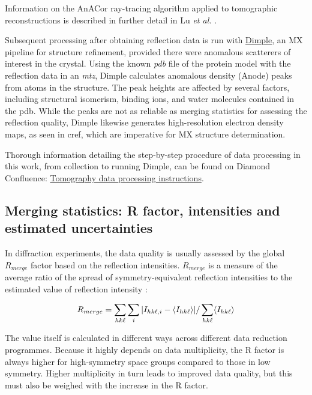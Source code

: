 Information on the AnACor ray-tracing algorithm applied to tomographic reconstructions is described in further detail in Lu \textit{et al.} \cite{Lu}.

Subsequent processing after obtaining reflection data is run with \href{http://ccp4.github.io/dimple}{Dimple}, an MX pipeline for structure refinement, provided there were anomalous scatterers of interest in the crystal. Using the known \textit{pdb} file of the protein model with the reflection data in an \textit{mtz}, Dimple calculates anomalous density (Anode) peaks from atoms in the structure. The peak heights are affected by several factors, including structural isomerism, binding ions, and water molecules contained in the pdb. While the peaks are not as reliable as merging statistics for assessing the reflection quality, Dimple likewise generates high-resolution electron density maps, as seen in cref{}, which are imperative for MX structure determination.

Thorough information detailing the step-by-step procedure of data processing in this work, from collection to running Dimple, can be found on Diamond Confluence: \href{https://confluence.diamond.ac.uk/x/yIWuD}{Tomography data processing instructions}. %


\subsection{Merging statistics: R factor, intensities and estimated uncertainties}

In diffraction experiments, the data quality is usually assessed by the global $R_{merge}$ factor based on the reflection intensities. $R_{merge}$ is a measure of the average ratio of the spread of symmetry-equivalent reflection intensities to the estimated value of reflection intensity \cite{Dauter1999}:

\begin{equation}
    R_{merge} = \sum_{hk\ell}\sum_i | I_{hk\ell,i} - \langle I_{hk\ell} \rangle | / \sum_{hk\ell} \langle I_{hk\ell} \rangle
\end{equation}

The value itself is calculated in different ways across different data reduction programmes. Because it highly depends on data multiplicity, the R factor is always higher for high-symmetry space groups compared to those in low symmetry. Higher multiplicity in turn leads to improved data quality, but this must also be weighed with the increase in the R factor.

